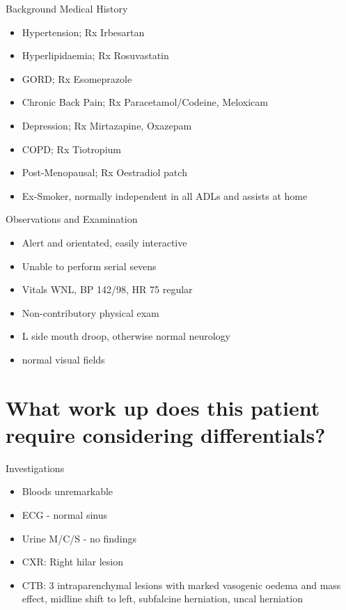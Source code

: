 \documentclass[9pt, compress]{beamer}
\begin{document}
     \begin{frame}
     	Background Medical History
        \begin{itemize}
        	\item Hypertension; Rx Irbesartan
            \item Hyperlipidaemia; Rx Rosuvastatin
            \item GORD; Rx Esomeprazole
            \item Chronic Back Pain; Rx Paracetamol/Codeine, Meloxicam
            \item Depression; Rx Mirtazapine, Oxazepam
            \item COPD; Rx Tiotropium
            \item Post-Menopausal; Rx Oestradiol patch
            \item Ex-Smoker, normally independent in all ADLs and assists at home
        \end{itemize}
     \end{frame}
     
     \begin{frame}
     	Observations and Examination
        	\begin{itemize}
            	\item Alert and orientated, easily interactive
                \item Unable to perform serial sevens
                \item Vitals WNL, BP 142/98, HR 75 regular
                \item Non-contributory physical exam
                \item L side mouth droop, otherwise normal neurology
                \item normal visual fields
            \end{itemize}
      \end{frame}
      
      \section{What work up does this patient require considering differentials?}
      
      \begin{frame}
      	Investigations
        \begin{itemize}
        	\item Bloods unremarkable
            \item ECG - normal sinus
            \item Urine M/C/S - no findings
            \item CXR: Right hilar lesion
            \item CTB: 3 intraparenchymal lesions with marked vasogenic oedema and mass effect, midline shift to left, subfalcine herniation, uncal herniation
        \end{itemize}
      \end{frame}
      
\end{document}

